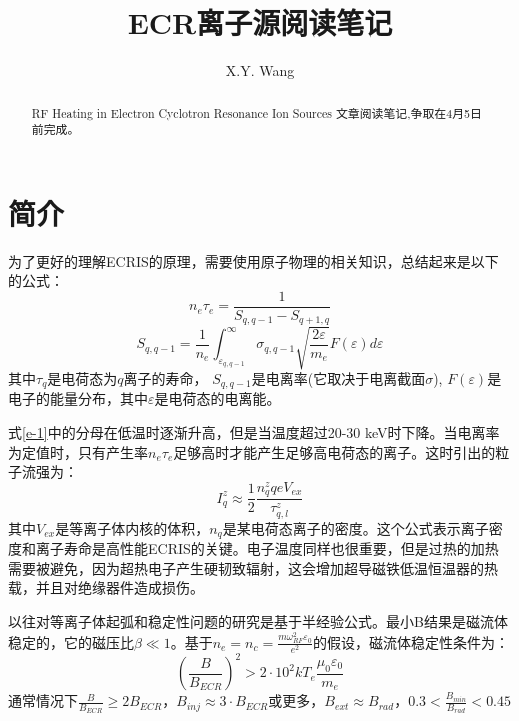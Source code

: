 \documentclass[fontset=windows]{article}
\title{ECR离子源阅读笔记}
\author{X.Y. Wang}
\begin{document}
\maketitle

\begin{abstract}
RF Heating in Electron Cyclotron Resonance Ion Sources 文章阅读笔记,争取在4月5日前完成。
\end{abstract}

\section{简介}
为了更好的理解ECRIS的原理，需要使用原子物理的相关知识，总结起来是以下的公式：
\begin{equation}
    n_e\tau_e=\frac{1}{S_{q,q-1}-S_{q+1,q}}
    \label{e-1}
\end{equation}
\begin{equation}
    S_{q,q-1}=\frac{1}{n_e}\int_{\varepsilon_{q,q-1}}^{\infty}\sigma_{q,q-1}\sqrt{\frac{2\varepsilon}{m_e}}F(\varepsilon)d\varepsilon
    \label{e-2}
\end{equation}
其中$\tau_q$是电荷态为$q$离子的寿命， $S_{q,q-1}$是电离率(它取决于电离截面$\sigma$), $F(\varepsilon)$是电子的能量分布，其中$\varepsilon$是电荷态的电离能。

式\ref{e-1}中的分母在低温时逐渐升高，但是当温度超过20-30 keV时下降。当电离率为定值时，只有产生率$n_e\tau_e$足够高时才能产生足够高电荷态的离子。这时引出的粒子流强为：
\begin{equation}
    I_q^z\approx\frac{1}{2}\frac{n_q^zqeV_{ex}}{\tau_{q,l}^z}
\end{equation}
其中$V_{ex}$是等离子体内核的体积，$n_q$是某电荷态离子的密度。这个公式表示离子密度和离子寿命是高性能ECRIS的关键。电子温度同样也很重要，但是过热的加热需要被避免，因为超热电子产生硬韧致辐射，这会增加超导磁铁低温恒温器的热载，并且对绝缘器件造成损伤。

以往对等离子体起弧和稳定性问题的研究是基于半经验公式。最小B结果是磁流体稳定的，它的磁压比$\beta\ll1$。基于$n_e=n_c=\frac{m\omega_{RF}^2\varepsilon_0}{e^2}$的假设，磁流体稳定性条件为：
\begin{equation}
    (\frac{B}{B_{ECR}})^2>2\cdot10^2kT_e\frac{\mu_0\varepsilon_0}{m_e}
\end{equation}
通常情况下$\frac{B}{B_{ECR}}\geq2B_{ECR}$，$B_{inj}\approx3\cdot B_{ECR}$或更多，$B_{ext}\approx B_{rad}$，$0.3<\frac{B_{min}}{B_{rad}}<0.45$


\end{document}
